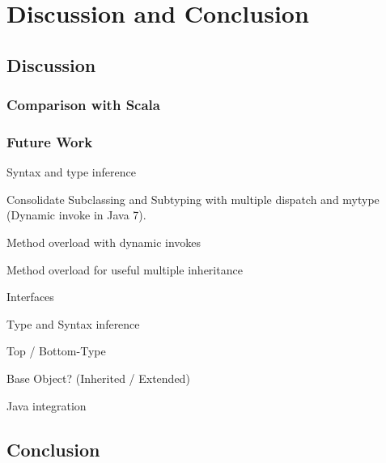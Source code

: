 \chapter{Discussion and Conclusion}
\section{Discussion}
\label{ctr:discussion}
\subsection{Comparison with Scala}
\label{sec:comparisonScala}

\subsection{Future Work}
\label{sec:futureWork}
Syntax and type inference


Consolidate Subclassing and Subtyping with multiple dispatch and mytype (Dynamic invoke in Java 7).

Method overload with dynamic invokes

Method overload for useful multiple inheritance

Interfaces

Type and Syntax inference

Top / Bottom-Type

Base Object? (Inherited / Extended)

Java integration


\section{Conclusion}
\label{ctr:conclusion}
